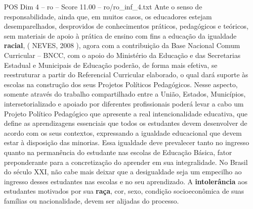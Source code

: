 \begin{textsample}{POS Dim 4 – ro – Score 11.00 – ro/ro\_inf\_4.txt}
Ante o senso de responsabilidade, ainda que, em muitos casos, os educadores estejam desemparelhados, desprovidos de conhecimentos práticos, pedagógicos e teóricos, sem materiais de apoio à prática de ensino com fins a educação da igualdade \textbf{racial}, ( NEVES, 2008 ), agora com a contribuição da Base Nacional Comum Curricular – BNCC, com o apoio do Ministério da Educação e das Secretarias Estadual e Municipais de Educação poderão, de forma mais efetiva, se reestruturar a partir do Referencial Curricular elaborado, o qual dará suporte às escolas na construção dos seus Projetos Políticos Pedagógicos.
Nesse aspecto, somente através do trabalho compartilhado entre a União, Estados, Municípios, intersetorializado e apoiado por diferentes profissionais poderá levar a cabo um Projeto Político Pedagógico que apresente a real intencionalidade educativa, que define as aprendizagens essenciais que todos os estudantes devem desenvolver de acordo com os seus contextos, expressando a igualdade educacional que devem estar à disposição das minorias.
Essa igualdade deve prevalecer tanto no ingresso quanto na permanência do estudante nas escolas de Educação Básica, fator preponderante para a concretização do aprender em sua integralidade.
No Brasil do século XXI, não cabe mais deixar que a desigualdade seja um empecilho ao ingresso desses estudantes nas escolas e no seu aprendizado.
A \textbf{intolerância} aos estudantes motivados por sua \textbf{raça}, cor, sexo, condição socioeconômica de suas famílias ou nacionalidade, devem ser alijadas do processo.

\end{textsample}
